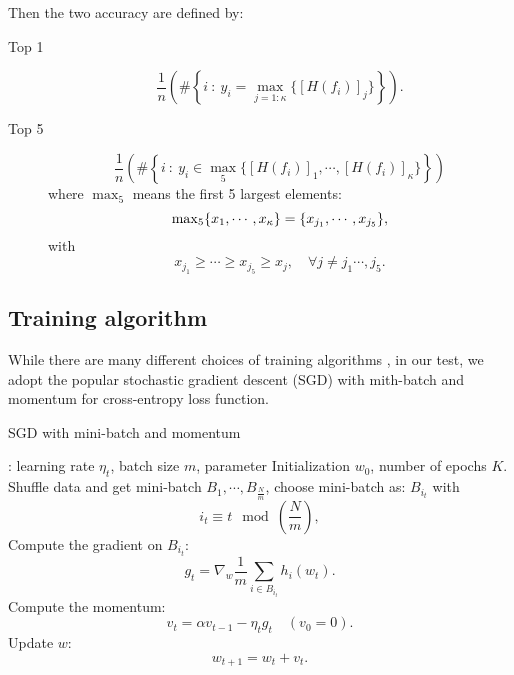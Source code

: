 Then the two accuracy are defined by:
\begin{description}
\item[Top 1] 
\begin{equation}
\frac{1}{n}\left( \# \left\{i~:~  y_i =  \max_{ j = 1:\kappa}\{[H(f_i)]_j \} \right \} \right).
\end{equation}
\item[Top 5] 
\begin{equation}
\frac{1}{n}\left( \# \left\{i~:~  y_i \in \max_5 \{ [H(f_i)]_1, \cdots, [H(f_i)]_\kappa \} \right \} \right)
\end{equation}
where $\max_5$ means the first 5 largest elements:
\begin{equation}
{\rm max}_5\{x_1, \cdots, x_\kappa \} = \{x_{j_1}, \cdots, x_{j_5}\},
\end{equation}
with
\begin{equation}
x_{j_1} \ge \cdots \ge x_{j_5} \ge x_{j}, \quad \forall j \neq j_1 \cdots, j_5.
\end{equation}

\end{description}

\subsection{Training algorithm}\label{subsec:traning}
While there are many different choices of training algorithms \cite{bottou2018optimization}, 
in our test, we adopt the popular 
stochastic gradient descent (SGD) with mith-batch and momentum for
cross-entropy loss function.
\begin{breakablealgorithm}
	\caption{SGD with mini-batch and momentum}
	\label{alg:sgd}
	\begin{algorithmic}
: learning rate $\eta_t$, batch size $m$, parameter Initialization $ w_0$, number of epochs $K$. 
 \\
\State Shuffle data and get mini-batch $B_1, \cdots, B_{\frac{N}{m}}$, choose mini-batch as: $B_{i_t}$ with
$$
i_t \equiv t \mod(\frac{N}{m}),
$$
\State Compute the gradient on $B_{i_t}$:
$$
g_t = \nabla_{w} \frac{1}{m} \sum_{i \in B_{i_t}} h_i(w_{t}).
$$
\State Compute the momentum:
\begin{equation}
v_t = \alpha v_{t-1} - \eta_t g_t \quad (v_0 = 0).
\end{equation}
\State Update $w$:
\begin{equation}
w_{t+1} = w_t + v_t.
\end{equation}
\EndFor
\end{algorithmic}
\end{breakablealgorithm}

